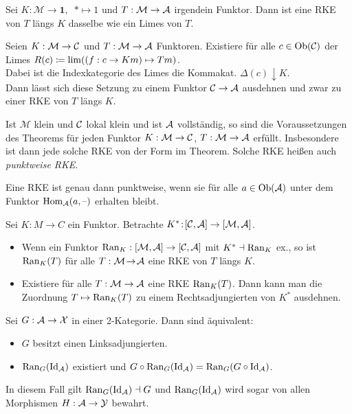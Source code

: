 \documentclass{cheat-sheet}
\newcommand{\ModC}{\mathcal{M}} %
\begin{document}
\begin{bsp}
  Sei $K : \ModC \to \mathbf{1}, \enspace * \mapsto 1$ und $T : \ModC \to \Aat$ irgendein Funktor. Dann ist eine RKE von $T$ längs $K$ dasselbe wie ein Limes von $T$.
\end{bsp}

\begin{thm}
  Seien $K : \ModC \to \Cat$ und $T : \ModC \to \Aat$ Funktoren.
  Existiere für alle $c \in \operatorname{Ob}(\mathcal{C})$ der Limes
  $R(c) \coloneqq \lim ((f : c \to Km) \mapsto Tm)$. \\
  Dabei ist die Indexkategorie des Limes die Kommakat. $\Delta(c) \downarrow K$. \\
  Dann lässt sich diese Setzung zu einem Funktor $\mathcal{C} \to \mathcal{A}$ ausdehnen und zwar zu einer RKE von $T$ längs $K$.
\end{thm}

\begin{bem}
  Ist $\ModC$ klein und $\mathcal{C}$ lokal klein und ist $\mathcal{A}$ vollständig, so sind die Voraussetzungen des Theorems für jeden Funktor $K : \ModC \to \Cat$, $T : \ModC \to \Aat$ erfüllt. Insbesondere ist dann jede solche RKE von der Form im Theorem. Solche RKE heißen auch \emph{punktweise RKE}.
\end{bem}

\begin{lem}
  Eine RKE ist genau dann punktweise, wenn sie für alle $a \in \operatorname{Ob}(\mathcal{A})$ unter dem Funktor $\operatorname{Hom}_{\mathcal{A}}(a, \text{--})$ erhalten bleibt.
\end{lem}

\begin{thm}
  Sei $K \!:\! M \to C$ ein Funktor. Betrachte $K^* \!:\! [\Cat, \Aat] \to [\ModC, \Aat]$.
  \begin{itemize}
    \item Wenn ein Funktor $\Ran_K : [\ModC,\Aat] \to [\Cat, \Aat]$ mit $K^* \dashv \operatorname{Ran}_K$ ex., so ist $\operatorname{Ran}_K(T)$ für alle $T : \ModC \!\to\! \Aat$ eine RKE von $T$ längs $K$.
    \item Existiere für alle $T : \ModC \to \Aat$ eine RKE $\operatorname{Ran}_K(T)$. Dann kann man die Zuordnung $T \mapsto \operatorname{Ran}_K(T)$ zu einem Rechtsadjungierten von $K^*$ ausdehnen.
  \end{itemize}
\end{thm}

\begin{thm}
  Sei $G : \mathcal{A} \to \mathcal{X}$ in einer 2-Kategorie. Dann sind äquivalent:
  \begin{itemize}
    \item $G$ besitzt einen Linksadjungierten.
    \item $\operatorname{Ran}_G(\operatorname{Id}_{\mathcal{A}})$ existiert und $G \circ \operatorname{Ran}_G(\operatorname{Id}_{\mathcal{A}}) = \operatorname{Ran}_G(G \circ \operatorname{Id}_{\mathcal{A}})$.
  \end{itemize}
  In diesem Fall gilt $\operatorname{Ran}_G(\operatorname{Id}_{\mathcal{A}}) \dashv G$ und $\operatorname{Ran}_G(\operatorname{Id}_{\mathcal{A}})$ wird sogar von allen Morphismen $H : \mathcal{A} \to \mathcal{Y}$ bewahrt.
\end{thm}
\end{document}
